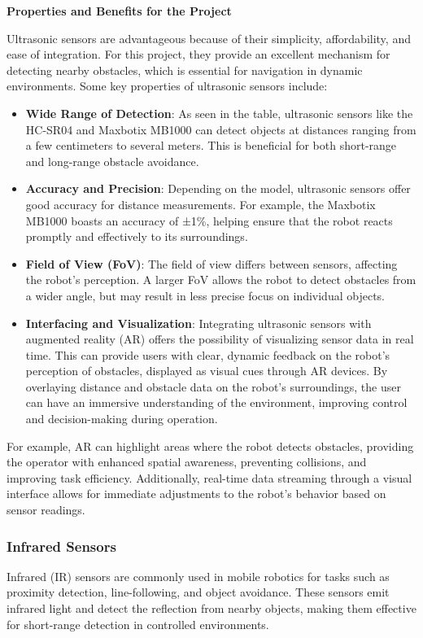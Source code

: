\noindent
\textbf{Properties and Benefits for the Project}

Ultrasonic sensors are advantageous because of their simplicity, affordability, and ease of integration. For this project, they provide an excellent mechanism for detecting nearby obstacles, which is essential for navigation in dynamic environments. Some key properties of ultrasonic sensors include:

\begin{itemize}
    \item \textbf{Wide Range of Detection}: As seen in the table, ultrasonic sensors like the HC-SR04 and Maxbotix MB1000 can detect objects at distances ranging from a few centimeters to several meters. This is beneficial for both short-range and long-range obstacle avoidance.
    \item \textbf{Accuracy and Precision}: Depending on the model, ultrasonic sensors offer good accuracy for distance measurements. For example, the Maxbotix MB1000 boasts an accuracy of ±1\%, helping ensure that the robot reacts promptly and effectively to its surroundings.
    \item \textbf{Field of View (FoV)}: The field of view differs between sensors, affecting the robot's perception. A larger FoV allows the robot to detect obstacles from a wider angle, but may result in less precise focus on individual objects.
    \item \textbf{Interfacing and Visualization}: Integrating ultrasonic sensors with augmented reality (AR) offers the possibility of visualizing sensor data in real time. This can provide users with clear, dynamic feedback on the robot’s perception of obstacles, displayed as visual cues through AR devices. By overlaying distance and obstacle data on the robot’s surroundings, the user can have an immersive understanding of the environment, improving control and decision-making during operation.
\end{itemize}

For example, AR can highlight areas where the robot detects obstacles, providing the operator with enhanced spatial awareness, preventing collisions, and improving task efficiency. Additionally, real-time data streaming through a visual interface allows for immediate adjustments to the robot's behavior based on sensor readings.

\subsubsection{Infrared Sensors}
Infrared (IR) sensors are commonly used in mobile robotics for tasks such as proximity detection, line-following, and object avoidance. These sensors emit infrared light and detect the reflection from nearby objects, making them effective for short-range detection in controlled environments.

